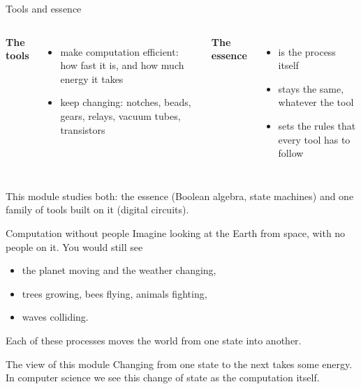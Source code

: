 \documentclass[10pt]{wosm-slides}
\begin{document}
\begin{frame}{Tools and essence}
  \begin{columns}[T]
      \textbf{The tools}
      \begin{itemize}
        \item make computation \alert{efficient}: how fast it is, and how much
          energy it takes
        \item keep changing: notches, beads, gears, relays, vacuum tubes,
          transistors
      \end{itemize}
      \textbf{The essence}
      \begin{itemize}
        \item is the process itself
        \item stays the same, whatever the tool
        \item sets the rules that every tool has to follow
      \end{itemize}
  \end{columns}

  \bigskip
  \begin{remark}
    This module studies both: the essence (Boolean algebra, state machines) and one
    family of tools built on it (digital circuits).
  \end{remark}
\end{frame}

\begin{frame}{Computation without people}
  Imagine looking at the Earth from space, with no people on it. You would still
  see
  \begin{itemize}
    \item the planet moving and the weather changing,
    \item trees growing, bees flying, animals fighting,
    \item waves colliding.
  \end{itemize}
  Each of these processes moves the world from one \alert{state} into another.

  \bigskip
  \begin{block}{The view of this module}
    Changing from one state to the next takes some energy. In computer science we
    see this change of state as the computation itself.
  \end{block}
\end{frame}
\end{document}
